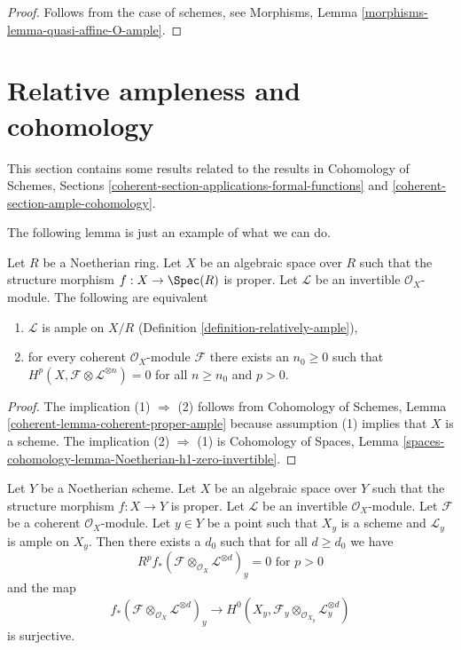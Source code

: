 \begin{proof}
Follows from the case of schemes, see
Morphisms, Lemma \ref{morphisms-lemma-quasi-affine-O-ample}.
\end{proof}



\section{Relative ampleness and cohomology}
\label{section-ample-and-proper}

\noindent
This section contains some results related to the results
in Cohomology of Schemes, Sections
\ref{coherent-section-applications-formal-functions} and
\ref{coherent-section-ample-cohomology}.

\medskip\noindent
The following lemma is just an example of what we can do.

\begin{lemma}
\label{lemma-vanshing-gives-ample}
Let $R$ be a Noetherian ring. Let $X$ be an algebraic space over $R$
such that the structure morphism $f : X \to \Spec(R)$ is proper.
Let $\mathcal{L}$ be an invertible $\mathcal{O}_X$-module.
The following are equivalent
\begin{enumerate}
\item $\mathcal{L}$ is ample on $X/R$
(Definition \ref{definition-relatively-ample}),
\item for every coherent $\mathcal{O}_X$-module $\mathcal{F}$
there exists an $n_0 \geq 0$ such that
$H^p(X, \mathcal{F} \otimes \mathcal{L}^{\otimes n}) = 0$
for all $n \geq n_0$ and $p > 0$.
\end{enumerate}
\end{lemma}

\begin{proof}
The implication (1) $\Rightarrow$ (2) follows from
Cohomology of Schemes, Lemma \ref{coherent-lemma-coherent-proper-ample}
because assumption (1) implies that $X$ is a scheme.
The implication (2) $\Rightarrow$ (1) is
Cohomology of Spaces, Lemma
\ref{spaces-cohomology-lemma-Noetherian-h1-zero-invertible}.
\end{proof}

\begin{lemma}
\label{lemma-ample-on-fibre}
Let $Y$ be a Noetherian scheme. Let $X$ be an algebraic space over $Y$
such that the structure morphism $f : X \to Y$ is proper.
Let $\mathcal{L}$ be an invertible $\mathcal{O}_X$-module.
Let $\mathcal{F}$ be a coherent $\mathcal{O}_X$-module.
Let $y \in Y$ be a point such that $X_y$ is a scheme and
$\mathcal{L}_y$ is ample on $X_y$.
Then there exists a $d_0$ such that for all $d \geq d_0$ we have
$$
R^pf_*(\mathcal{F} \otimes_{\mathcal{O}_X} \mathcal{L}^{\otimes d})_y = 0
\text{ for }p > 0
$$
and the map
$$
f_*(\mathcal{F} \otimes_{\mathcal{O}_X} \mathcal{L}^{\otimes d})_y
\longrightarrow
H^0(X_y, \mathcal{F}_y \otimes_{\mathcal{O}_{X_y}} \mathcal{L}_y^{\otimes d})
$$
is surjective.
\end{lemma}

